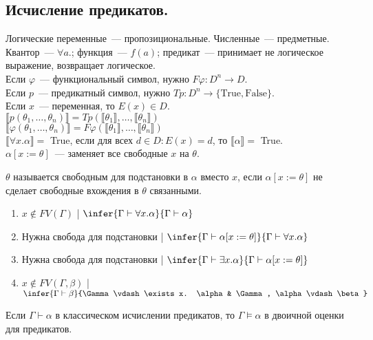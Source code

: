 \documentclass{article}
\begin{document}
	\subsection{Исчисление предикатов.}
	Логические переменные~--- пропозициональные. Численные~--- предметные. \\
	Квантор~--- $\forall a.$; функция~--- $f(a)$; предикат~--- принимает не логическое выражение, возвращает логическое. \\
	Если $\varphi$~--- функциональный символ, нужно $F\varphi: D^n \rightarrow D$. \\
	Если $p$~--- предикатный символ, нужно $Tp: D^n \rightarrow \{ \text{True}, \text{False} \}$. \\
	Если $x$~--- переменная, то $E(x) \in D$. \\
	$\llbracket p(\theta_1, \dots, \theta_n) \rrbracket = Tp(\llbracket \theta_1 \rrbracket, \dots, \llbracket \theta_n \rrbracket)$ \\
	$\llbracket \varphi (\theta_1, \dots, \theta_n) \rrbracket = F\varphi(\llbracket \theta_1 \rrbracket, \dots, \llbracket \theta_n \rrbracket)$ \\
	$\llbracket \forall x. \alpha \rrbracket =$ True, если для всех $d \in D: E(x) = d$, то $\llbracket \alpha \rrbracket =$ True. \\
	$\alpha [ x := \theta ]$~--- заменяет все свободные $x$ на $\theta$.
	\begin{definition}
		$\theta$ называется свободным для подстановки в $\alpha$ вместо $x$, если $\alpha [x := \theta]$ не сделает свободные вхождения в $\theta$ связанными.
	\end{definition}
	\begin{enumerate}
		\item $x \not\in FV(\Gamma)$ | $\infer{\Gamma \vdash \forall x. \alpha}{\Gamma \vdash \alpha}$
		\item Нужна свобода для подстановки | $\infer{\Gamma \vdash \alpha [x := \theta]}{\Gamma \vdash \forall x. \alpha}$
		\item Нужна свобода для подстановки | $\infer{\Gamma \vdash \exists x. \alpha}{\Gamma \vdash \alpha [x := \theta]}$
		\item $x \not\in FV(\Gamma, \beta)$ | $\infer{\Gamma \vdash \beta}{\Gamma \vdash \exists x. \alpha & \Gamma, \alpha \vdash \beta}$
	\end{enumerate}
	\begin{theorem}
		Если $\Gamma \vdash \alpha$ в классическом исчислении предикатов, то $\Gamma \vDash \alpha$ в двоичной оценки для предикатов.
	\end{theorem}
\end{document}
